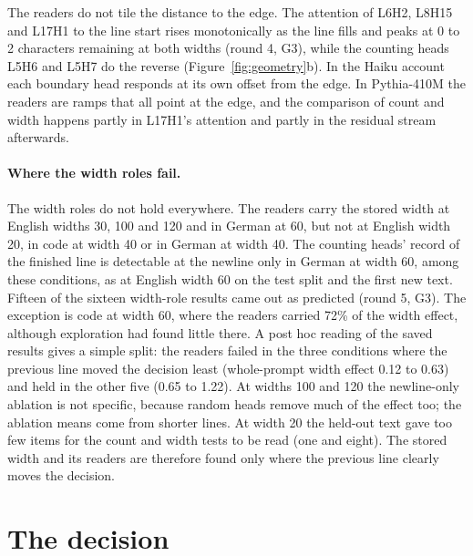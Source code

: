 \documentclass[11pt,a4paper]{article}
\begin{document}
The readers do not tile the distance to the edge. The attention of L6H2, L8H15 and L17H1 to the line start rises monotonically as the line fills and peaks at 0 to 2 characters remaining at both widths (round 4, G3), while the counting heads L5H6 and L5H7 do the reverse (Figure~\ref{fig:geometry}b). In the Haiku account each boundary head responds at its own offset from the edge. In Pythia-410M the readers are ramps that all point at the edge, and the comparison of count and width happens partly in L17H1's attention and partly in the residual stream afterwards.

\paragraph{Where the width roles fail.}
The width roles do not hold everywhere. The readers carry the stored width at English widths 30, 100 and 120 and in German at 60, but not at English width 20, in code at width 40 or in German at width 40. The counting heads' record of the finished line is detectable at the newline only in German at width 60, among these conditions, as at English width 60 on the test split and the first new text. Fifteen of the sixteen width-role results came out as predicted (round 5, G3). The exception is code at width 60, where the readers carried 72\% of the width effect, although exploration had found little there. A post hoc reading of the saved results gives a simple split: the readers failed in the three conditions where the previous line moved the decision least (whole-prompt width effect 0.12 to 0.63) and held in the other five (0.65 to 1.22). At widths 100 and 120 the newline-only ablation is not specific, because random heads remove much of the effect too; the ablation means come from shorter lines. At width 20 the held-out text gave too few items for the count and width tests to be read (one and eight). The stored width and its readers are therefore found only where the previous line clearly moves the decision.

\section{The decision}
\label{sec:decision}
\end{document}
